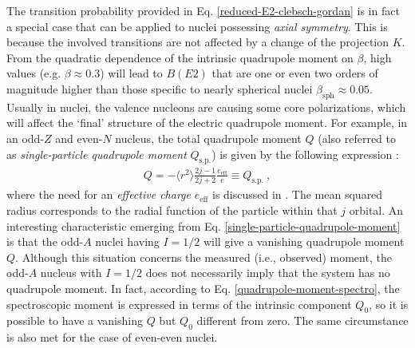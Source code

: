The transition probability provided in Eq. \ref{reduced-E2-clebsch-gordan} is in fact a special case that can be applied to nuclei possessing \emph{axial symmetry}. This is because the involved transitions are not affected by a change of the projection $K$.
From the quadratic dependence of the intrinsic quadrupole moment on $\beta$, high values (e.g. $\beta\approx 0.3$) will lead to $B(E2)$ that are one or even two orders of magnitude higher than those specific to nearly spherical nuclei $\beta_\text{sph}\approx 0.05$. Usually in nuclei, the valence nucleons are causing some core polarizations, which will affect the `final' structure of the electric quadrupole moment. For example, in an odd-$Z$ and even-$N$ nucleus, the total quadrupole moment $Q$ (also referred to as \emph{single-particle quadrupole moment} $Q_\text{s.p.}$) is given by the following expression \cite{bertulani2007nuclear}:
\begin{align}
    Q=-\langle r^2\rangle\frac{2j-1}{2j+2}\frac{e_\text{eff}}{e}\equiv Q_\text{s.p.}\ ,
    \label{single-particle-quadrupole-moment}
\end{align}
where the need for an \emph{effective charge} $e_\text{eff}$ is discussed in \cite{heyde1994nuclear}. The mean squared radius corresponds to the radial function of the particle within that $j$ orbital. 
An interesting characteristic emerging from Eq. \ref{single-particle-quadrupole-moment} is that the odd-$A$ nuclei having $I=1/2$ will give a vanishing quadrupole moment $Q$. Although this situation concerns the measured (i.e., observed) moment, the odd-$A$ nucleus with $I=1/2$ does not necessarily imply that the system has no quadrupole moment. In fact, according to Eq. \ref{quadrupole-moment-spectro}, the spectroscopic moment is expressed in terms of the intrinsic component $Q_0$, so it is possible to have a vanishing $Q$ but $Q_0$ different from zero. The same circumstance is also met for the case of even-even nuclei.

